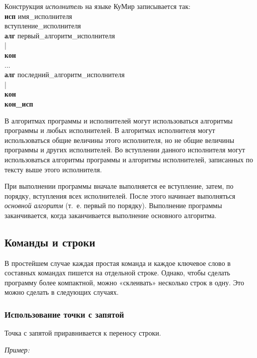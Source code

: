 Конструкция \emph{исполнитель} на языке КуМир записывается так:
{\sffamily\\
\textbf{исп} имя\_исполнителя\\
вступление\_исполнителя\\
\textbf{алг} первый\_алгоритм\_исполнителя\\
|\\
\textbf{кон}\\
...\\
\textbf{алг} последний\_алгоритм\_исполнителя\\
|\\
\textbf{кон}\\
\textbf{кон\_исп}
}

В алгоритмах программы и исполнителей могут использоваться алгоритмы программы и любых исполнителей. В алгоритмах исполнителя могут использоваться общие величины этого исполнителя, но не общие величины программы и других исполнителей. Во вступлении данного исполнителя могут использоваться алгоритмы программы и алгоритмы исполнителей, записанных по тексту выше этого исполнителя.

При выполнении программы вначале выполняется ее вступление, затем, по порядку, вступления всех исполнителей. После этого начинает выполняться \emph{основной алгоритм} (т.~е. первый по порядку). Выполнение программы заканчивается, когда заканчивается выполнение основного алгоритма.

\subsection{Команды и строки}

В простейшем случае каждая простая команда и каждое ключевое слово в составных командах пишется на отдельной строке. Однако, чтобы сделать программу более компактной, можно «склеивать» несколько строк в одну. Это можно сделать в следующих случаях.
 
\subsubsection{Использование точки с запятой}

Точка с запятой приравнивается к переносу строки.

\emph{Пример:}

